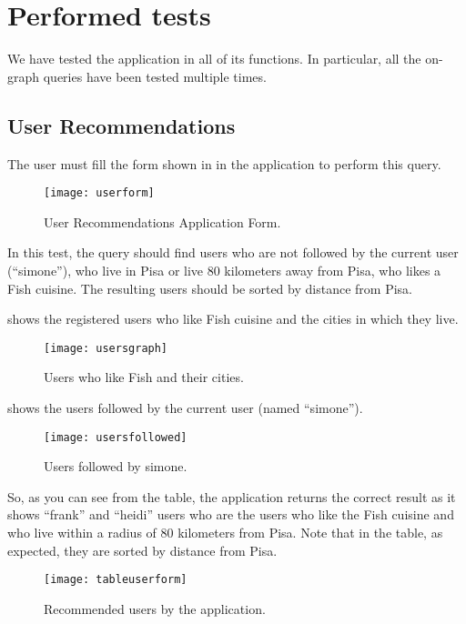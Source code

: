 \chapter{Performed tests}\label{ch:tests}

We have tested the application in all of its functions. In particular, all the
on-graph queries have been tested multiple times.

\section{User Recommendations}

The user must fill the form shown in  in the application to
perform this query.

\begin{figure}[htb]
	\centering
	\texttt{[image: userform]}
	\caption{User Recommendations Application Form.}\label{fig:userform}
\end{figure}

In this test, the query should find users who are not followed by the current
user (``simone''), who live in Pisa or live 80 kilometers away from Pisa, who
likes a Fish cuisine. The resulting users should be sorted by distance from
Pisa.

 shows the registered users who like Fish cuisine and the
cities in which they live.

\begin{figure}[htb]%
	\centering
	\texttt{[image: usersgraph]}
	\caption{Users who like Fish and their cities.}\label{fig:usersgraph}
\end{figure}

 shows the users followed by the current user (named
``simone'').

\begin{figure}[htb]%
	\centering
	\texttt{[image: usersfollowed]}
	\caption{Users followed by simone.}\label{fig:usersfollowed}
\end{figure}

So, as you can see from the table, the application returns the correct result as
it shows ``frank'' and ``heidi'' users who are the users who like the Fish
cuisine and who live within a radius of 80 kilometers from Pisa. Note that in
the table, as expected, they are sorted by distance from Pisa.

\begin{figure}[htb]
	\centering
	\texttt{[image: tableuserform]}
	\caption{Recommended users by the application.}\label{fig:tableuserform}
\end{figure}

